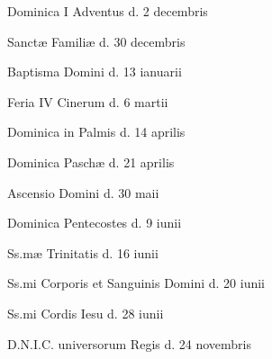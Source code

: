\newpage
\thispagestyle{empty}
\medskip
\fontsize{12}{12}\selectfont
\setlength{\parskip}{0.1cm}
Dominica I Adventus \dotfill d. 2 decembris\par
Sanctæ Familiæ \dotfill d. 30 decembris\par
Baptisma Domini \dotfill d. 13 ianuarii\par
Feria IV Cinerum \dotfill d. 6 martii\par
Dominica in Palmis \dotfill d. 14 aprilis\par
Dominica Paschæ \dotfill d. 21 aprilis\par
Ascensio Domini \dotfill d. 30 maii\par
Dominica Pentecostes \dotfill d. 9 iunii\par
Ss.mæ Trinitatis \dotfill d. 16 iunii\par
Ss.mi Corporis et Sanguinis Domini \dotfill d. 20 iunii\par
Ss.mi Cordis Iesu \dotfill d. 28 iunii\par
D.N.I.C. universorum Regis \dotfill d. 24 novembris\par
\vspace{1cm}
\newpage
\thispagestyle{empty}
\setlength{\tabcolsep}{0cm}
